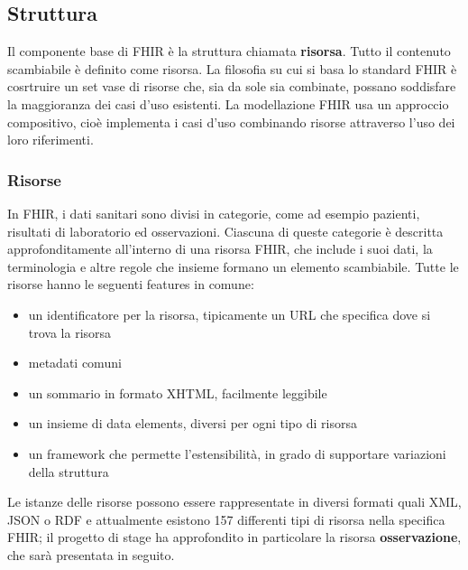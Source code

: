 \documentclass{article}
\begin{document}
\subsection{Struttura}
Il componente base di FHIR è la struttura chiamata \textbf{risorsa}. Tutto il contenuto scambiabile è definito come risorsa.
La filosofia su cui si basa lo standard FHIR è cosrtruire un set vase di risorse che, sia da sole sia combinate, possano soddisfare la maggioranza dei casi d'uso esistenti.
La modellazione FHIR usa un approccio compositivo, cioè implementa i casi d'uso combinando risorse attraverso l'uso dei loro riferimenti.

\subsubsection{Risorse}
In FHIR, i dati sanitari sono divisi in categorie, come ad esempio pazienti, risultati di laboratorio ed osservazioni.
Ciascuna di queste categorie è descritta approfonditamente all'interno di una risorsa FHIR, che include i suoi dati, la terminologia e altre regole che insieme formano un elemento
scambiabile.
Tutte le risorse hanno le seguenti features in comune:

\begin{itemize}
    \item un identificatore per la risorsa, tipicamente un URL che specifica dove si trova la risorsa
    \item metadati comuni
    \item un sommario in formato XHTML, facilmente leggibile
    \item un insieme di data elements, diversi per ogni tipo di risorsa
    \item un framework che permette l'estensibilità, in grado di supportare variazioni della struttura
\end{itemize}

Le istanze delle risorse possono essere rappresentate in diversi formati quali XML, JSON o RDF e attualmente esistono
157 differenti tipi di risorsa nella specifica FHIR; il progetto di stage ha approfondito in particolare la risorsa \textbf{osservazione},
che sarà presentata in seguito.
\end{document}
